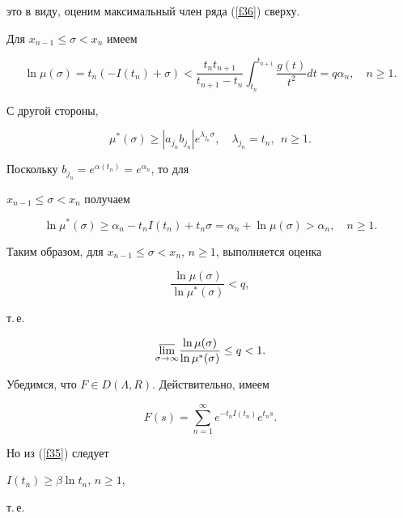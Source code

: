 это в виду, оценим максимальный член ряда (\ref{f36}) сверху.





Для $x_{n-1}\leq\sigma<x_{n}$ имеем


$$


\ln\mu(\sigma)=t_{n}(-I(t_{n})+\sigma)<\frac{t_n t_{n+1}}{t_{n+1}-t_n}


\int_{t_n}^{t_{n+1}}\frac{g(t)}{t^2}dt=q\alpha_n,\quad n\geq 1.


$$


С другой стороны,


$$


\mu^* (\sigma)\geq |a_{j_n} b_{j_n}|e^{\lambda_{j_n}\sigma},\quad


\lambda_{j_n}=t_n,\ \  n\geq 1.


$$


Поскольку $b_{j_n}=e^{\alpha(t_n)}=e^{\alpha_n}$, то для


$x_{n-1}\leq\sigma<x_n$ получаем


$$


\ln\mu^* (\sigma)\geq\alpha_n-t_n I(t_n)+t_n\sigma=\alpha_n+\ln\mu(\sigma)>


\alpha_n,\quad n\geq 1.


$$


Таким образом, для $x_{n-1}\leq\sigma<x_n$, $n\geq 1$, выполняется оценка


$$


\frac{\ln\mu(\sigma)}{\ln\mu^* (\sigma)}<q,


$$


т.\,е.


\begin{equation}\label{f38}


\underset{\sigma\to\infty}{\varlimsup}{}


\frac{\ln\mu(\sigma)}{\ln\mu^* (\sigma)}\leq q<1.


\end{equation}





Убедимся, что $F\in D(\Lambda,R)$. Действительно, имеем


$$


F(s)=\sum_{n=1}^{\infty}e^{-t_n I(t_n)}e^{t_n s}.


$$


Но из (\ref{f35}) следует


$I(t_{n})\geq\beta\ln t_n$, $n\geq 1$,


т.\,е.


